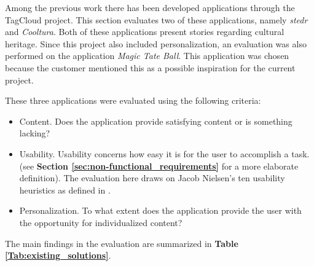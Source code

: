 Among the previous work there has been developed applications through the TagCloud project. This section evaluates two of these applications, namely \textit{stedr} and \textit{Cooltura}. Both of these applications present stories regarding cultural heritage. Since this project also included personalization, an evaluation was also performed on the application \textit{Magic Tate Ball}. This application was chosen because the customer mentioned this as a possible inspiration for the current project. \newline

These three applications were evaluated using the following criteria:
\begin{itemize}
\item Content. Does the application provide satisfying content or is something lacking?
\item Usability. Usability concerns how easy it is for the user to accomplish a task. (see \textbf{Section \ref{sec:non-functional_requirements}} for a more elaborate definition). The evaluation here draws on Jacob Nielsen’s ten usability heuristics as defined in \cite{AS3}.  
\item Personalization. To what extent does the application provide the user with the opportunity for individualized content?
\end{itemize}

The main findings in the evaluation are summarized in \textbf{Table \ref{Tab:existing_solutions}}.

